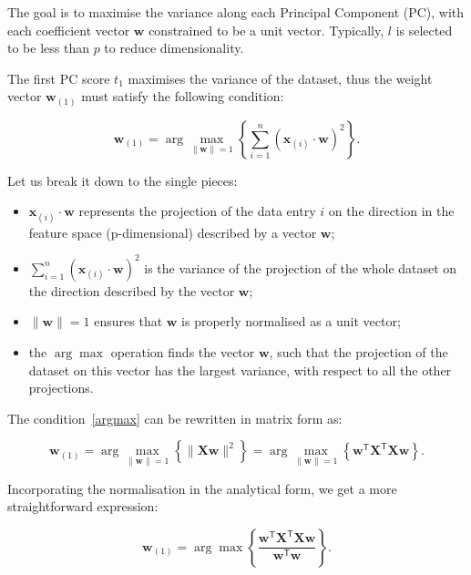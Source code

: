 The goal is to maximise the variance along each Principal Component (PC), with each coefficient vector $\mathbf{w}$ constrained to be a unit vector. Typically, $l$ is selected to be less than $p$ to reduce dimensionality.


The first PC score $t_{1}$ maximises the variance of the dataset, thus the weight vector $\mathbf{w}_{(1)}$ must satisfy the following condition:

\begin{equation}
\mathbf{w}_{(1)} = \arg \max_{\|\mathbf{w}\| = 1} \left\{ \sum_{i=1}^{n} \left( \mathbf{x}_{(i)} \cdot \mathbf{w} \right)^2 \right\}.\label{argmax}
\end{equation}

Let us break it down to the single pieces: 
\begin{itemize}
    \item $\mathbf{x}_{(i)} \cdot \mathbf{w}$ represents the projection of the data entry $i$ on the direction in the feature space (p-dimensional) described by a vector $ \mathbf{w}$;
    \item $ \sum_{i=1}^{n} \left( \mathbf{x}_{(i)} \cdot \mathbf{w} \right)^2$ is the variance of the projection of the whole dataset on the direction described by the vector $ \mathbf{w}$;
    \item $\|\mathbf{w}\| = 1$ ensures that $\mathbf{w}$ is properly normalised as a unit vector;
    \item the $\arg \max$ operation finds the vector $\mathbf{w}$, such that the projection of the dataset on this vector has the largest variance, with respect to all the other projections.
\end{itemize}

The condition~\ref{argmax} can be rewritten in matrix form as:

\begin{equation}
\mathbf{w}_{(1)} = \arg \max_{\|\mathbf{w}\| = 1} \left\{ \|\mathbf{Xw}\|^2 \right\} = \arg \max_{\|\mathbf{w}\| = 1} \left\{ \mathbf{w}^{\mathsf{T}} \mathbf{X}^{\mathsf{T}} \mathbf{Xw} \right\}.
\end{equation}

Incorporating the normalisation in the analytical form, we get a more straightforward expression:

\begin{equation}
\mathbf{w}_{(1)} = \arg \max \left\{ \frac{\mathbf{w}^{\mathsf{T}} \mathbf{X}^{\mathsf{T}} \mathbf{Xw}}{\mathbf{w}^{\mathsf{T}} \mathbf{w}} \right\}.\label{first_weight}
\end{equation}

